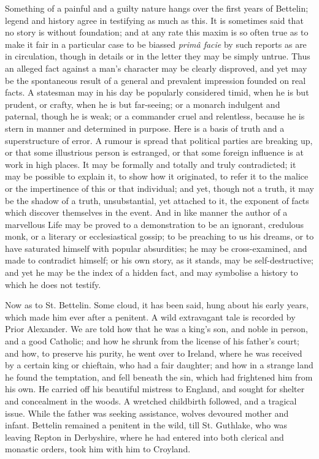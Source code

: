 Something of a painful and a guilty nature hangs
over the first years of Bettelin; legend and history agree in
testifying as much as this. It is sometimes said that no story is
without foundation; and at any rate this maxim is so often true as to
make it fair in a particular case to be biassed \emph{primâ facie} by
such reports as are in circulation, though in details or in the letter
they may be simply untrue. Thus an alleged fact against a man's
character may be clearly disproved, and yet may be the spontaneous
result of a general and prevalent impression founded on real facts. A
statesman may in his day be popularly considered timid, when he is but
prudent, or crafty, when he is but far-seeing; or a monarch indulgent
and paternal, though he is weak; or a commander cruel and relentless,
because he is stern in manner and determined in purpose. Here is a
basis of truth and a superstructure of error. A rumour is spread that
political parties are breaking up, or that some illustrious person is
estranged, or that some foreign influence is at work in high places.
It may be formally and totally and truly contradicted; it may be
possible to explain it, to show how it originated, to refer it to the
malice or the impertinence of this or that individual; and yet,
though not a truth, it may be the shadow of a truth, unsubstantial,
yet attached to it, the exponent of facts which discover themselves in
the event. And in like manner the author of a marvellous Life may be
proved to a demonstration to be an ignorant, credulous monk, or a
literary or ecclesiastical gossip; to be preaching to us his dreams,
or to have saturated himself with popular absurdities; he may be
cross-examined, and made to contradict himself; or his own story, as
it stands, may be self-destructive; and yet he may be the index of a
hidden fact, and may symbolise a history to which he does not testify.

Now as to St. Bettelin. Some cloud, it has been
said, hung about his early years, which made him ever after a
penitent. A wild extravagant tale is recorded by Prior Alexander. We
are told how that he was a king's son, and noble in person, and a good
Catholic; and how he shrunk from the license of his father's court;
and how, to preserve his purity, he went over to Ireland, where he was
received by a certain king or chieftain, who had a fair daughter; and
how in a strange land he found the temptation, and fell beneath the
sin, which had frightened him from his own. He carried off his
beautiful mistress to England, and sought for shelter and concealment
in the woods. A wretched childbirth followed, and a tragical issue.
While the father was seeking assistance, wolves devoured mother and
infant. Bettelin remained a penitent in the wild, till St. Guthlake,
who was leaving Repton in Derbyshire, where he had entered into both
clerical and monastic orders, took him with him to Croyland.

